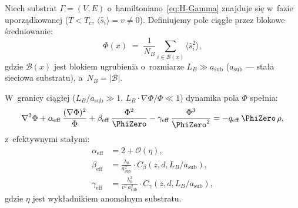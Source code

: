 \begin{theorem}\label{thm:emergent-field-eq}
Niech substrat $\Gamma = (V, E)$ o~hamiltoniano~\eqref{eq:H-Gamma}
znajduje si\k{e} w~fazie uporz\k{a}dkowanej ($T < T_c$,
$\langle\hat{s}_i\rangle = v \neq 0$). Definiujemy pole
ci\k{a}g\l{}e przez blokowe \'sredniowanie:
\begin{equation}\label{eq:phi-def-block}
  \Phi(x) \;=\; \frac{1}{N_B}\sum_{i \in \mathcal{B}(x)}
  \langle\hat{s}_i^2\rangle,
\end{equation}
gdzie $\mathcal{B}(x)$ jest blokiem ugrubienia o~rozmiarze
$L_B \gg a_{\mathrm{sub}}$ ($a_{\mathrm{sub}}$ --- sta\l{}a
sieciowa substratu), a~$N_B = |\mathcal{B}|$.

W~granicy ci\k{a}g\l{}ej ($L_B/a_{\mathrm{sub}} \gg 1$,
$L_B \cdot \nabla\Phi/\Phi \ll 1$) dynamika pola $\Phi$
spe\l{}nia:
\begin{equation}\label{eq:emergent-eq}
  \nabla^2\Phi + \alpha_{\mathrm{eff}}\,\frac{(\nabla\Phi)^2}{\Phi}
  + \beta_{\mathrm{eff}}\,\frac{\Phi^2}{\PhiZero}
  - \gamma_{\mathrm{eff}}\,\frac{\Phi^3}{\PhiZero^2}
  = -q_{\mathrm{eff}}\,\PhiZero\,\rho,
\end{equation}
z~efektywnymi sta\l{}ymi:
\begin{align}
  \alpha_{\mathrm{eff}} &= 2 + \mathcal{O}(\eta),
  \label{eq:alpha-eff-substrate} \\
  \beta_{\mathrm{eff}} &= \frac{\lambda_0}{a_{\mathrm{sub}}^2}
    \cdot C_\beta(z, d, L_B/a_{\mathrm{sub}}),
  \label{eq:beta-eff-substrate} \\
  \gamma_{\mathrm{eff}} &= \frac{\lambda_0^2}{v^2\,a_{\mathrm{sub}}^2}
    \cdot C_\gamma(z, d, L_B/a_{\mathrm{sub}}),
  \label{eq:gamma-eff-substrate}
\end{align}
gdzie $\eta$ jest wyk\l{}adnikiem anomalnym substratu.
\end{theorem}

